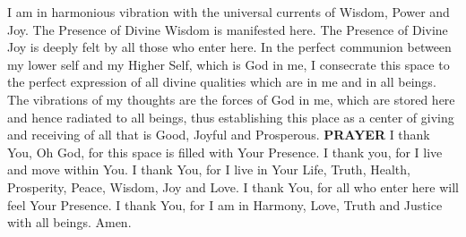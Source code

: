     I am in harmonious vibration with the universal
    currents of Wisdom, Power and Joy. The Presence
    of Divine Wisdom is manifested here. The Presence
    of Divine Joy is deeply felt by all those who enter
    here.
    \parspace
    In the perfect communion between my lower self and
    my Higher Self, which is God in me, I consecrate
    this space to the perfect expression of all divine
    qualities which are in me and in all beings.
    \parspace
    The vibrations of my thoughts are the forces of God
    in me, which are stored here and hence radiated to
    all beings, thus establishing this place as a center
    of giving and receiving of all that is Good, Joyful
    and Prosperous.
    \parspace
    \textbf{PRAYER}
    \parspace
    I thank You, Oh God, for this space is filled with
    Your Presence.
    \parspace
    I thank you, for I live and move within You.
    \parspace
    I thank You, for I live in Your Life, Truth, Health,
    Prosperity, Peace, Wisdom, Joy and Love.
    \parspace
    I thank You, for all who enter here will feel Your
    Presence.
    \parspace
    I thank You, for I am in Harmony, Love, Truth and
    Justice with all beings.
    \parspace
    Amen.
  \endverse
\endsong


